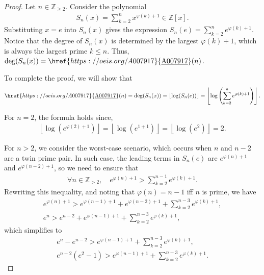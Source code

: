 \documentclass[10pt,a4paper]{article}
\theoremstyle{plain}
\newcommand{\floor}[1]{\left\lfloor #1 \right\rfloor}
\newcommand{\Z}{\mathbb{Z}}
\newcommand{\seqnum}[1]{\href{https://oeis.org/#1}{\rm \underline{#1}}}
\begin{document}
\begin{proof}
Let $n \in \Z_{\geq 2}$. Consider the polynomial
\begin{align*}
S_n(x) = \sum_{k=2}^n x^{\varphi(k)+1} \in \Z[x].
\end{align*}
Substituting $x = e$ into $S_n(x)$ gives the expression $S_n(e) = \sum_{k=2}^n e^{\varphi(k)+1}$. Notice that the degree of $S_n(x)$ is determined by the largest $\varphi(k) + 1$, which is always the largest prime $k \leq n$. Thus, $\deg(S_n(x)) = \seqnum{A007917}(n)$.

To complete the proof, we will show that 
\begin{align*}
\seqnum{A007917}(n) = \deg(S_n(x)) = \floor{\log(S_n(e))} = \floor{ \log\left( \sum_{k=2}^n e^{\varphi(k)+1} \right) } .
\end{align*}

For $n=2$, the formula holds since,
\begin{align*}
    \floor{\log(e^{\varphi(2)+1})} = \floor{\log(e^{1+1})} = \floor{\log(e^2)} = 2 .
\end{align*}

For $n > 2$, we consider the worst-case scenario, which occurs when $n$ and $n-2$ are a twin prime pair. In such case, the leading terms in $S_n(e)$ are $e^{\varphi(n)+1}$ and $e^{\varphi(n-2)+1}$, so we need to ensure that
\begin{align*}
\forall n \in \Z_{>2}, \quad
e^{\varphi(n)+1} > \sum_{k=2}^{n-1} e^{\varphi(k)+1} .
\end{align*}
Rewriting this inequality, and noting that $\varphi(n) = n-1$ iff $n$ is prime, we have
\begin{align*}
e^{\varphi(n)+1} > e^{\varphi(n-1)+1} + e^{\varphi(n-2)+1} + \sum_{k=2}^{n-3} e^{\varphi(k)+1} , \\
e^n > e^{n-2} + e^{\varphi(n-1)+1} + \sum_{k=2}^{n-3} e^{\varphi(k)+1} ,
\end{align*}
which simplifies to
\begin{align*}
e^n - e^{n-2} > e^{\varphi(n-1)+1} + \sum_{k=2}^{n-3} e^{\varphi(k)+1} , \\
e^{n-2} (e^2-1) > e^{\varphi(n-1)+1} + \sum_{k=2}^{n-3} e^{\varphi(k)+1}.
\end{align*}


\end{proof}
\end{document}
